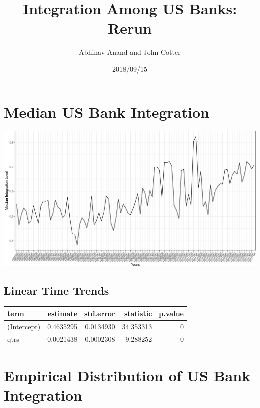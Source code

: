 \documentclass[11pt,]{article}
\title{Integration Among US Banks: Rerun}
\author{Abhinav Anand and John Cotter}
\date{2018/09/15}
\begin{document}
\maketitle

\section{Median US Bank Integration}\label{median-us-bank-integration}

\begin{center}\includegraphics{AC_US_Bank_Int_Results_1_files/figure-latex/med_US_bank_int-1} \end{center}

\subsection{Linear Time Trends}\label{linear-time-trends}

\begin{longtable}[]{@{}lrrrr@{}}
\toprule
term & estimate & std.error & statistic & p.value\tabularnewline
\midrule
\endhead
(Intercept) & 0.4635295 & 0.0134930 & 34.353313 & 0\tabularnewline
qtrs & 0.0021438 & 0.0002308 & 9.288252 & 0\tabularnewline
\bottomrule
\end{longtable}

\section{Empirical Distribution of US Bank
Integration}\label{empirical-distribution-of-us-bank-integration}
\end{document}
